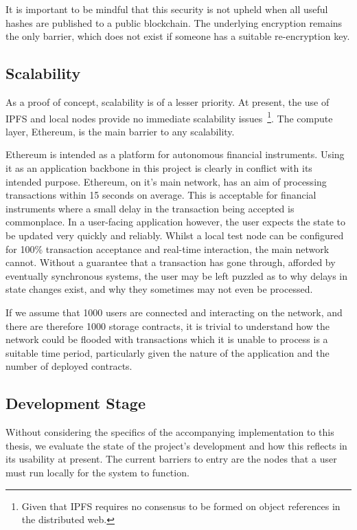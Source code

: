 It is important to be mindful that this security is not upheld when all useful hashes are published to a public blockchain. The underlying encryption remains the only barrier, which does not exist if someone has a suitable re-encryption key.

\subsection{Scalability}

As a proof of concept, scalability is of a lesser priority. At present, the use of IPFS and local nodes provide no immediate scalability issues~\footnote{Given that IPFS requires no consensus to be formed on object references in the distributed web.}. The compute layer, Ethereum, is the main barrier to any scalability.

Ethereum is intended as a platform for autonomous financial instruments. Using it as an application backbone in this project is clearly in conflict with its intended purpose. Ethereum, on it's main network, has an aim of processing transactions within 15 seconds on average. This is acceptable for financial instruments where a small delay in the transaction being accepted is commonplace. In a user-facing application however, the user expects the state to be updated very quickly and reliably. Whilst a local test node can be configured for 100\% transaction acceptance and real-time interaction, the main network cannot. Without a guarantee that a transaction has gone through, afforded by eventually synchronous systems, the user may be left puzzled as to why delays in state changes exist, and why they sometimes may not even be processed.

If we assume that 1000 users are connected and interacting on the network, and there are therefore 1000 storage contracts, it is trivial to understand how the network could be flooded with transactions which it is unable to process is a suitable time period, particularly given the nature of the application and the number of deployed contracts.

\subsection{Development Stage}

Without considering the specifics of the accompanying implementation to this thesis, we evaluate the state of the project's development and how this reflects in its usability at present. The current barriers to entry are the nodes that a user must run locally for the system to function.

